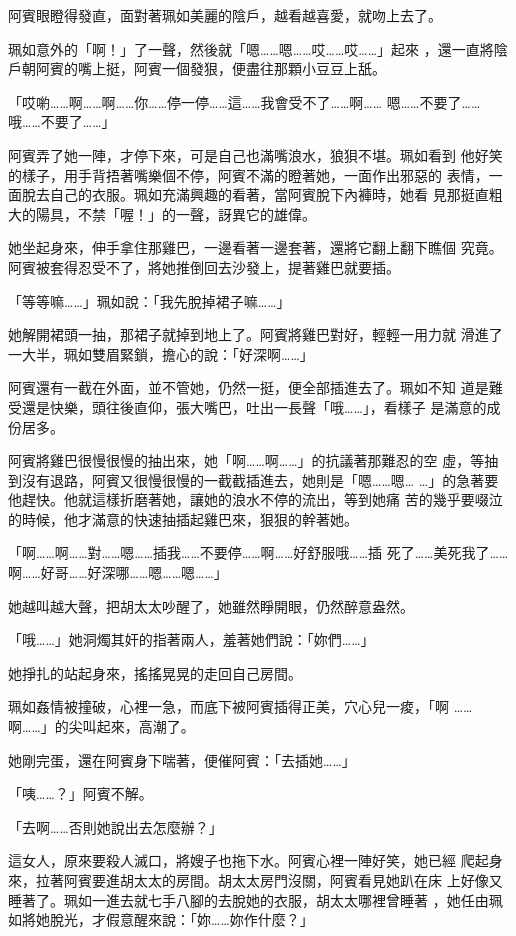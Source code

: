阿賓眼瞪得發直，面對著珮如美麗的陰戶，越看越喜愛，就吻上去了。

珮如意外的「啊！」了一聲，然後就「嗯……嗯……哎……哎……」起來
，還一直將陰戶朝阿賓的嘴上挺，阿賓一個發狠，便盡往那顆小豆豆上舐。

「哎喲……啊……啊……你……停一停……這……我會受不了……啊……
嗯……不要了……哦……不要了……」

阿賓弄了她一陣，才停下來，可是自己也滿嘴浪水，狼狽不堪。珮如看到
他好笑的樣子，用手背捂著嘴樂個不停，阿賓不滿的瞪著她，一面作出邪惡的
表情，一面脫去自己的衣服。珮如充滿興趣的看著，當阿賓脫下內褲時，她看
見那挺直粗大的陽具，不禁「喔！」的一聲，訝異它的雄偉。

她坐起身來，伸手拿住那雞巴，一邊看著一邊套著，還將它翻上翻下瞧個
究竟。阿賓被套得忍受不了，將她推倒回去沙發上，提著雞巴就要插。

「等等嘛……」珮如說：「我先脫掉裙子嘛……」

她解開裙頭一抽，那裙子就掉到地上了。阿賓將雞巴對好，輕輕一用力就
滑進了一大半，珮如雙眉緊鎖，擔心的說：「好深啊……」

阿賓還有一截在外面，並不管她，仍然一挺，便全部插進去了。珮如不知
道是難受還是快樂，頭往後直仰，張大嘴巴，吐出一長聲「哦……」，看樣子
是滿意的成份居多。

阿賓將雞巴很慢很慢的抽出來，她「啊……啊……」的抗議著那難忍的空
虛，等抽到沒有退路，阿賓又很慢很慢的一截截插進去，她則是「嗯……嗯…
…」的急著要他趕快。他就這樣折磨著她，讓她的浪水不停的流出，等到她痛
苦的幾乎要啜泣的時候，他才滿意的快速抽插起雞巴來，狠狠的幹著她。

「啊……啊……對……嗯……插我……不要停……啊……好舒服哦……插
死了……美死我了……啊……好哥……好深哪……嗯……嗯……」

她越叫越大聲，把胡太太吵醒了，她雖然睜開眼，仍然醉意盎然。

「哦……」她洞燭其奸的指著兩人，羞著她們說：「妳們……」

她掙扎的站起身來，搖搖晃晃的走回自己房間。

珮如姦情被撞破，心裡一急，而底下被阿賓插得正美，穴心兒一痠，「啊
……啊……」的尖叫起來，高潮了。

她剛完蛋，還在阿賓身下喘著，便催阿賓：「去插她……」

「咦……？」阿賓不解。

「去啊……否則她說出去怎麼辦？」

這女人，原來要殺人滅口，將嫂子也拖下水。阿賓心裡一陣好笑，她已經
爬起身來，拉著阿賓要進胡太太的房間。胡太太房門沒關，阿賓看見她趴在床
上好像又睡著了。珮如一進去就七手八腳的去脫她的衣服，胡太太哪裡曾睡著
，她任由珮如將她脫光，才假意醒來說：「妳……妳作什麼？」

